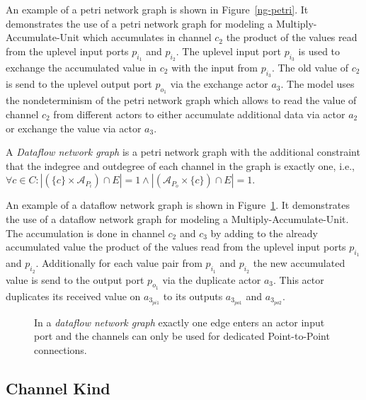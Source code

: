   An example of a petri network graph is shown in Figure~\ref{ng-petri}.
  It demonstrates the use of a petri network graph for modeling
  a Multiply-Accumulate-Unit which accumulates in channel $c_2$ the product of
  the values read from the uplevel input ports $p_{i_1}$ and $p_{i_2}$.
  The uplevel input port $p_{i_3}$ is used to exchange the
  accumulated value in $c_2$ with the input from $p_{i_3}$. The
  old value of $c_2$ is send to the uplevel output port $p_{o_1}$
  via the exchange actor $a_3$. The model uses the nondeterminism
  of the petri network graph which allows to read the value of channel
  $c_2$ from different actors to either accumulate additional
  data via actor $a_2$ or exchange the value via actor $a_3$.

\begin{definition}\label{dataflow-network-graph}
  A \emph{Dataflow network graph} is a petri network graph with the additional constraint
  that the indegree and outdegree of each channel in the graph is exactly one, i.e.,
  $\forall{c \in C}: |(\{c\} \times \mathcal{A}_{P_{i}}) \cap E| = 1 \wedge
                    |(\mathcal{A}_{P_{o}} \times \{c\}) \cap E| = 1$.
\end{definition}

  An example of a dataflow network graph is shown in Figure~\ref{ng-dataflow}.
  It demonstrates the use of a dataflow network graph for modeling
  a Multiply-Accumulate-Unit. The accumulation is done in channel $c_2$ and $c_3$
  by adding to the already accumulated value the product of
  the values read from the uplevel input ports $p_{i_1}$ and $p_{i_2}$.
  Additionally for each value pair from $p_{i_1}$ and $p_{i_2}$ the
  new accumulated value is send to the output port $p_{o_1}$ via
  the duplicate actor $a_3$. This actor duplicates its received
  value on $a_{3_{pi1}}$ to its outputs $a_{3_{po1}}$ and $a_{3_{po2}}$.

\begin{figure}
\centering

\caption{\label{ng-dataflow} In a \emph{dataflow network graph} exactly
  one edge enters an actor input port and
  the channels can only be used for dedicated
  Point-to-Point connections.}
\end{figure}

\subsection{Channel Kind}\label{channel-kind}

